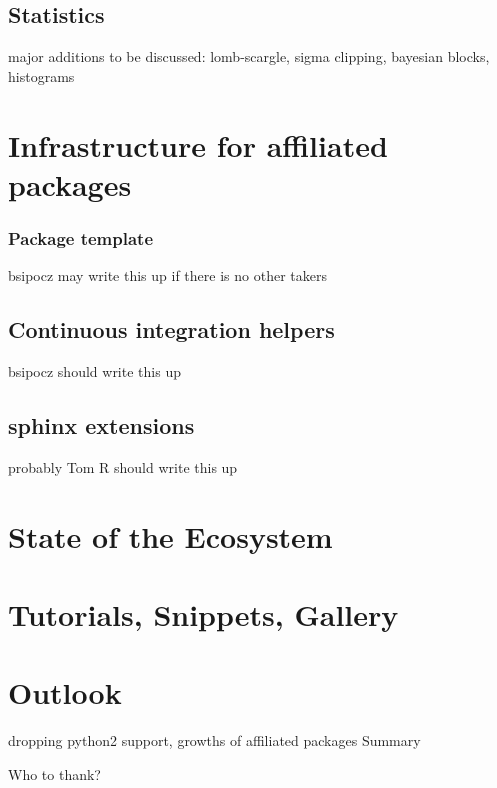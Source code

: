 \documentclass[modern]{aastex61}
\begin{document}
\subsection{Statistics}


major additions to be discussed: lomb-scargle, sigma clipping, bayesian blocks, histograms

\section{Infrastructure for affiliated packages}
\subsubsection{Package template}
bsipocz may write this up if there is no other takers
\subsection{Continuous integration helpers}
bsipocz should write this up
\subsection{sphinx extensions}
probably Tom R should write this up
\section{State of the Ecosystem}

\section{Tutorials, Snippets, Gallery}

\section{Outlook}
dropping python2 support, growths of affiliated packages
Summary

\acknowledgments

Who to thank?


          
          


\begin{thebibliography}{}

\end{thebibliography}
\end{document}

